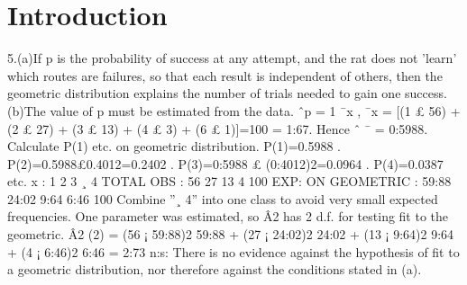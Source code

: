 \documentclass{article}
\begin{document}
\maketitle

\section{Introduction}

5.(a)If p is the probability of success at any attempt, and the rat does not ’learn’ which routes are
failures, so that each result is independent of others, then the geometric distribution explains the
number of trials needed to gain one success.
(b)The value of p must be estimated from the data.
ˆp = 1
¯x , ¯x = [(1 £ 56) + (2 £ 27) + (3 £ 13) + (4 £ 3) + (6 £ 1)]=100 = 1:67.
Hence ˆ ¯ = 0:5988. Calculate P(1) etc. on geometric distribution.
P(1)=0.5988 . P(2)=0.5988£0.4012=0.2402 .
P(3)=0:5988 £ (0:4012)2=0.0964 . P(4)=0.0387 etc.
x : 1 2 3 ¸ 4 TOTAL
OBS : 56 27 13 4 100
EXP: ON GEOMETRIC : 59:88 24:02 9:64 6:46 100
Combine ”¸ 4” into one class to avoid very small expected frequencies. One parameter was
estimated, so Â2 has 2 d.f. for testing fit to the geometric.
Â2
(2) =
(56 ¡ 59:88)2
59:88
+
(27 ¡ 24:02)2
24:02
+
(13 ¡ 9:64)2
9:64
+
(4 ¡ 6:46)2
6:46
= 2:73 n:s:
There is no evidence against the hypothesis of fit to a geometric distribution, nor therefore against
the conditions stated in (a).
\end{document}
